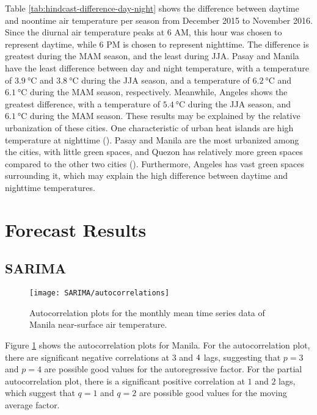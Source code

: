 		Table \ref{tab:hindcast-difference-day-night} shows the difference between daytime and noontime air temperature per season from December 2015 to November 2016.
		Since the diurnal air temperature peaks at 6 AM, this hour was chosen to represent daytime, while 6 PM is chosen to represent nighttime.
		The difference is greatest during the MAM season, and the least during JJA.
		Pasay and Manila have the least difference between day and night temperature,
			with a temperature of $\qty{3.9}{\degreeCelsius}$ and $\qty{3.8}{\degreeCelsius}$ during the JJA season,
			and a temperature of $\qty{6.2}{\degreeCelsius}$ and $\qty{6.1}{\degreeCelsius}$ during the MAM season,
			respectively.
		Meanwhile, Angeles shows the greatest difference, with a temperature of $\qty{5.4}{\degreeCelsius}$ during the JJA season, and $\qty{6.1}{\degreeCelsius}$ during the MAM season.
		These results may be explained by the relative urbanization of these cities.
		One characteristic of urban heat islands are high temperature at nighttime (\cite{Oke2017urban}).
		Pasay and Manila are the most urbanized among the cities, with little green spaces,
			and Quezon has relatively more green spaces compared to the other two cities (\cite{Bilang2022}).
		Furthermore, Angeles has vast green spaces surrounding it, which may explain the high difference between daytime and nighttime temperatures.
	
\section{Forecast Results}
	\subsection{SARIMA}
				
		\begin{figure}
			\centering
			\texttt{[image: SARIMA/autocorrelations]}
			\caption{
				Autocorrelation plots for the monthly mean time series data of Manila near-surface air temperature.
			}
			\label{fig:sarima-autocorrelations}
		\end{figure}	
		
		Figure \ref{fig:sarima-autocorrelations} shows the autocorrelation plots for Manila.
		For the autocorrelation plot, 
			there are significant negative correlations at $\num{3}$ and $\num4$ lags,
			suggesting that $p = 3$ and $p = 4$ are possible good values for the autoregressive factor.
		For the partial autocorrelation plot,
			there is a significant positive correlation at $\num{1}$ and $\num{2}$ lags,
			which suggest that $q = 1$ and $q = 2$ are possible good values for the moving average factor.
		
